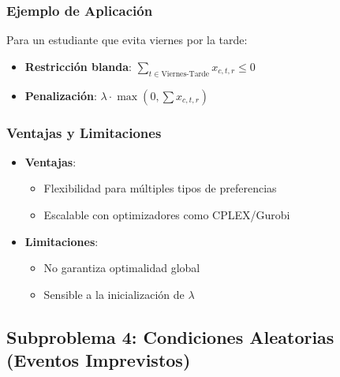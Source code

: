 \documentclass[12pt, a4paper]{article}
\begin{document}
\subsubsection*{Ejemplo de Aplicación}
Para un estudiante que evita viernes por la tarde:
\begin{itemize}
    \item \textbf{Restricción blanda}: $\sum_{t \in \text{Viernes-Tarde}} x_{c,t,r} \leq 0$
    \item \textbf{Penalización}: $\lambda \cdot \max(0, \sum x_{c,t,r})$
\end{itemize}

\subsubsection*{Ventajas y Limitaciones}
\begin{itemize}
    \item \textbf{Ventajas}:
    \begin{itemize}
        \item Flexibilidad para múltiples tipos de preferencias
        \item Escalable con optimizadores como CPLEX/Gurobi
    \end{itemize}
    
    \item \textbf{Limitaciones}:
    \begin{itemize}
        \item No garantiza optimalidad global
        \item Sensible a la inicialización de $\lambda$
    \end{itemize}
\end{itemize}

\subsection{Subproblema 4: Condiciones Aleatorias (Eventos Imprevistos)}
\end{document}
